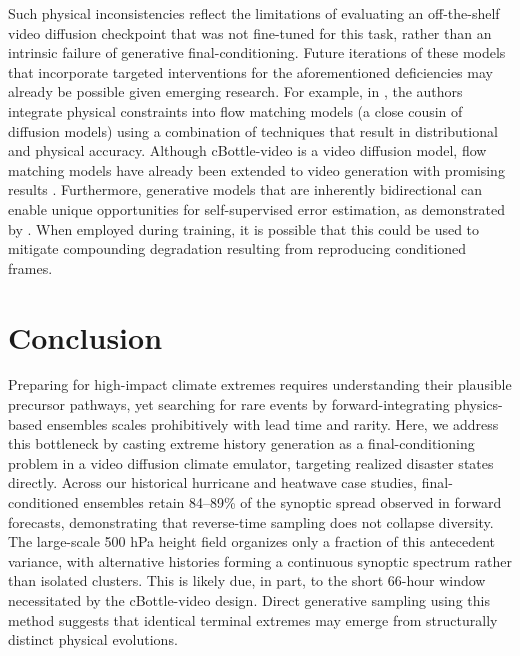 \documentclass[final]{agujournal2019}
\begin{document}
Such physical inconsistencies reflect the limitations of evaluating an off-the-shelf video diffusion checkpoint that was not fine-tuned for this task, rather than an intrinsic failure of generative final-conditioning. Future iterations of these models that incorporate targeted interventions for the aforementioned deficiencies may already be possible given emerging research. For example, in , the authors integrate physical constraints into flow matching models (a close cousin of diffusion models) using a combination of techniques that result in distributional and physical accuracy. Although cBottle-video is a video diffusion model, flow matching models have already been extended to video generation with promising results \cite{Jin2024-wd}. Furthermore, generative models that are inherently bidirectional can enable unique opportunities for self-supervised error estimation, as demonstrated by . When employed during training, it is possible that this could be used to mitigate compounding degradation resulting from reproducing conditioned frames.

\section{Conclusion}

Preparing for high-impact climate extremes requires understanding their plausible precursor pathways, yet searching for rare events by forward-integrating physics-based ensembles scales prohibitively with lead time and rarity. Here, we address this bottleneck by casting extreme history generation as a final-conditioning problem in a video diffusion climate emulator, targeting realized disaster states directly. Across our historical hurricane and heatwave case studies, final-conditioned ensembles retain 84--89\% of the synoptic spread observed in forward forecasts, demonstrating that reverse-time sampling does not collapse diversity. The large-scale 500 hPa height field organizes only a fraction of this antecedent variance, with alternative histories forming a continuous synoptic spectrum rather than isolated clusters. This is likely due, in part, to the short 66-hour window necessitated by the cBottle-video design. Direct generative sampling using this method suggests that identical terminal extremes may emerge from structurally distinct physical evolutions.
\end{document}

